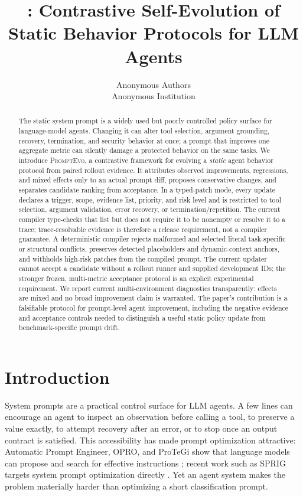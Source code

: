 \documentclass[10pt]{article}
\title{\method: Contrastive Self-Evolution of Static Behavior Protocols for LLM Agents}
\author{Anonymous Authors\\Anonymous Institution}
\date{}
\newcommand{\method}{\textsc{PromptEvo}}
\begin{document}
\maketitle

\begin{abstract}
The static system prompt is a widely used but poorly controlled policy surface for language-model agents. Changing it can alter tool selection, argument grounding, recovery, termination, and security behavior at once; a prompt that improves one aggregate metric can silently damage a protected behavior on the same tasks. We introduce \method{}, a contrastive framework for evolving a \emph{static} agent behavior protocol from paired rollout evidence. It attributes observed improvements, regressions, and mixed effects only to an actual prompt diff, proposes conservative changes, and separates candidate ranking from acceptance. In a typed-patch mode, every update declares a trigger, scope, evidence list, priority, and risk level and is restricted to tool selection, argument validation, error recovery, or termination/repetition. The current compiler type-checks that list but does not require it to be nonempty or resolve it to a trace; trace-resolvable evidence is therefore a release requirement, not a compiler guarantee. A deterministic compiler rejects malformed and selected literal task-specific or structural conflicts, preserves detected placeholders and dynamic-context anchors, and withholds high-risk patches from the compiled prompt. The current updater cannot accept a candidate without a rollout runner and supplied development IDs; the stronger frozen, multi-metric acceptance protocol is an explicit experimental requirement. We report current multi-environment diagnostics transparently: effects are mixed and no broad improvement claim is warranted. The paper's contribution is a falsifiable protocol for prompt-level agent improvement, including the negative evidence and acceptance controls needed to distinguish a useful static policy update from benchmark-specific prompt drift.
\end{abstract}

\section{Introduction}
System prompts are a practical control surface for LLM agents. A few lines can encourage an agent to inspect an observation before calling a tool, to preserve a value exactly, to attempt recovery after an error, or to stop once an output contract is satisfied. This accessibility has made prompt optimization attractive: Automatic Prompt Engineer, OPRO, and ProTeGi show that language models can propose and search for effective instructions \cite{ape,opro,protegi}; recent work such as SPRIG targets system prompt optimization directly \cite{sprig}. Yet an agent system makes the problem materially harder than optimizing a short classification prompt.
\end{document}
